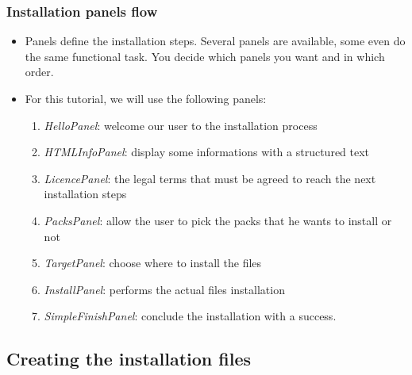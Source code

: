 \documentclass[compress,10pt]{beamer}
\begin{document}
\begin{frame}

\frametitle{Installation panels flow}

\begin{itemize}

  \item Panels define the installation steps. Several panels are available, some
  even do the same functional task.
  \alert{You decide which panels you want and in which order.}

  \item For this tutorial, we will use the following panels:
    \begin{enumerate}

      \item \textsl{HelloPanel}: welcome our user to the installation process

      \item \textsl{HTMLInfoPanel}: display some informations with a structured
      text

      \item \textsl{LicencePanel}: the legal terms that must be agreed to reach
      the next installation steps

      \item \textsl{PacksPanel}: allow the user to pick the packs that he wants
      to install or not

      \item \textsl{TargetPanel}: choose where to install the files

      \item \textsl{InstallPanel}: performs the actual files installation

      \item \textsl{SimpleFinishPanel}: conclude the installation with a success.

    \end{enumerate}

\end{itemize}

\end{frame}


\subsection{Creating the installation files}
\end{document}
